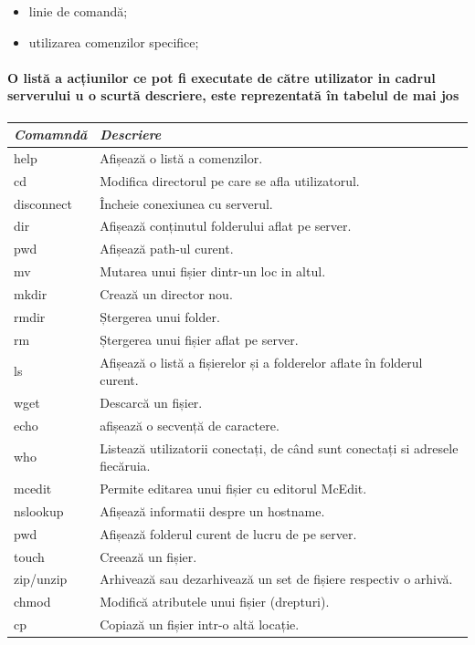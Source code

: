 \documentclass{article}
\begin{document}
	\begin{itemize}
		\item linie de comandă;
		\item utilizarea comenzilor specifice;
		
		
		
	\end{itemize}
	
	\paragraph{
		O listă a acțiunilor ce pot fi executate de către utilizator in cadrul serverului u o scurtă descriere, este reprezentată în tabelul de mai jos
	}
	\begin{center}
		\begin{tabular}{|l|p{12cm}|}
			\hline
			\textbf{\textit{Comamndă}} & \textbf{\textit{Descriere}} \\ \hline
			help & Afișează o listă a comenzilor. \\ \hline
			cd & Modifica directorul pe care se afla utilizatorul. \\ \hline
			disconnect & Încheie conexiunea cu serverul. \\ \hline
			dir & Afișează conținutul folderului aflat pe server.\\ \hline
			pwd & Afișează path-ul curent. \\ \hline
			mv & Mutarea unui fișier dintr-un loc in altul.\\ \hline
			mkdir & Crează un director nou. \\ \hline
			rmdir & Ștergerea unui folder. \\ \hline
			rm & Ștergerea unui fișier aflat pe server. \\ \hline
			ls & Afișează o listă a fișierelor și a folderelor aflate în folderul curent. \\ \hline
			wget & Descarcă un fișier. \\ \hline
			echo & afișează o secvență de caractere.\\ \hline
			who & Listează utilizatorii conectați, de când sunt conectați si adresele fiecăruia. \\ \hline
			mcedit & Permite editarea unui fișier cu editorul McEdit. \\ \hline
			nslookup & Afișează informatii despre un hostname. \\ \hline
			pwd & Afișează folderul curent de lucru de pe server. \\ \hline
			touch & Creează un fișier. \\ \hline
			zip/unzip & Arhivează sau dezarhivează un set de fișiere respectiv o arhivă. \\ \hline
			chmod & Modifică atributele unui fișier (drepturi).\\ \hline
			cp & Copiază un fișier intr-o altă locație. \\
			\hline
		\end{tabular}
	\end{center}
\end{document}
